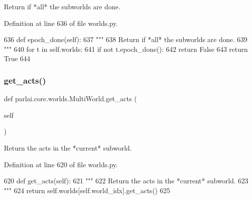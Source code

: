 \begin{DoxyVerb}Return if *all* the subworlds are done.
\end{DoxyVerb}
 

Definition at line 636 of file worlds.\+py.


\begin{DoxyCode}
636     \textcolor{keyword}{def }epoch\_done(self):
637         \textcolor{stringliteral}{"""}
638 \textcolor{stringliteral}{        Return if *all* the subworlds are done.}
639 \textcolor{stringliteral}{        """}
640         \textcolor{keywordflow}{for} t \textcolor{keywordflow}{in} self.worlds:
641             \textcolor{keywordflow}{if} \textcolor{keywordflow}{not} t.epoch\_done():
642                 \textcolor{keywordflow}{return} \textcolor{keyword}{False}
643         \textcolor{keywordflow}{return} \textcolor{keyword}{True}
644 
\end{DoxyCode}
\mbox{\label{classparlai_1_1core_1_1worlds_1_1MultiWorld_a73074f333544de25b4e07ffc48819896}} 
\subsubsection{\texorpdfstring{get\+\_\+acts()}{get\_acts()}}
{\footnotesize\ttfamily def parlai.\+core.\+worlds.\+Multi\+World.\+get\+\_\+acts (\begin{DoxyParamCaption}\item[{}]{self }\end{DoxyParamCaption})}

\begin{DoxyVerb}Return the acts in the *current* subworld.
\end{DoxyVerb}
 

Definition at line 620 of file worlds.\+py.


\begin{DoxyCode}
620     \textcolor{keyword}{def }get\_acts(self):
621         \textcolor{stringliteral}{"""}
622 \textcolor{stringliteral}{        Return the acts in the *current* subworld.}
623 \textcolor{stringliteral}{        """}
624         \textcolor{keywordflow}{return} self.worlds[self.world\_idx].get\_acts()
625 
\end{DoxyCode}
\mbox{\label{classparlai_1_1core_1_1worlds_1_1MultiWorld_a6e012b3db760d95f189baf3466fc55d0}} 
